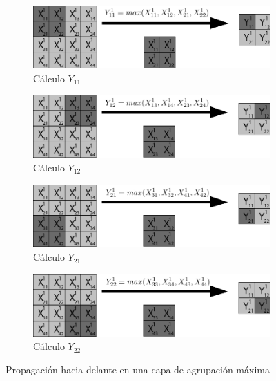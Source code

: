 \begin{figure}[H]
	\centering
	\begin{subfigure}{.5\textwidth}
		\hspace{-10mm}
		\includegraphics[width=1.2\linewidth]{imagenes/maxpool_1.jpg}  
		\caption{Cálculo $Y_{11}$}
	\end{subfigure}%
	\begin{subfigure}{.5\textwidth}
		\hspace{10mm}
		\includegraphics[width=1.2\linewidth]{imagenes/maxpool_2.jpg}  
		\caption{Cálculo $Y_{12}$}
	\end{subfigure}
	
	\vspace{5mm}
	\begin{subfigure}{.5\textwidth}
		\hspace{-10mm}
		\includegraphics[width=1.2\linewidth]{imagenes/maxpool_3.jpg}  
		\caption{Cálculo $Y_{21}$}
	\end{subfigure}%
	\begin{subfigure}{.5\textwidth}
		\hspace{10mm}
		\includegraphics[width=1.2\linewidth]{imagenes/maxpool_4.jpg}  
		\caption{Cálculo $Y_{22}$}
	\end{subfigure}
	\caption{Propagación hacia delante en una capa de agrupación máxima}
	\label{fig:forward_prop_maxpool}
\end{figure}

